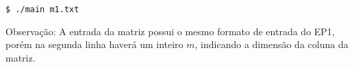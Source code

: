 \documentclass[
	12pt,				%
	openright,			%
	oneside,			%
	a4paper,			%
	english,			%
	french,				%
	spanish,			%
	brazil,				%
	]{abntex2}
\begin{document}
\verb!$ ./main m1.txt!

Observação: A entrada da matriz possui o mesmo formato de entrada do EP1, porém na segunda linha haverá um inteiro $m$, indicando a dimensão da coluna da matriz.







%
%
%
\end{document}
